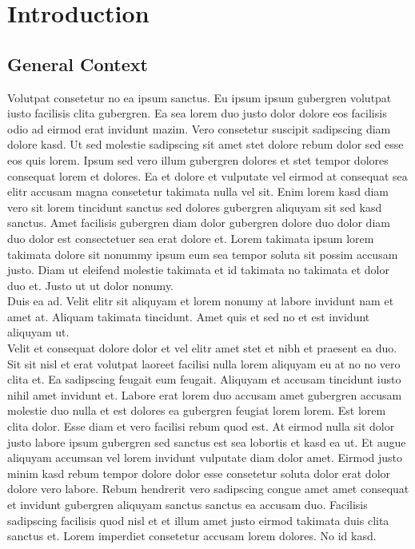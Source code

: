 \documentclass[a4paper,11pt]{article}
\begin{document}
\section{Introduction}
\subsection{General Context}
%
Volutpat consetetur no ea ipsum sanctus. Eu ipsum ipsum gubergren volutpat iusto facilisis clita gubergren. Ea sea lorem duo justo dolor dolore eos facilisis odio ad eirmod erat invidunt mazim. Vero consetetur suscipit sadipscing diam dolore kasd. Ut sed molestie sadipscing sit amet stet dolore rebum dolor sed esse eos quis lorem. Ipsum sed vero illum gubergren dolores et stet tempor dolores consequat lorem et dolores. Ea et dolore et vulputate vel eirmod at consequat sea elitr accusam magna consetetur takimata nulla vel sit. Enim lorem kasd diam vero sit lorem tincidunt sanctus sed dolores gubergren aliquyam sit sed kasd sanctus. Amet facilisis gubergren diam dolor gubergren dolore duo dolor diam duo dolor est consectetuer sea erat dolore et. Lorem takimata ipsum lorem takimata dolore sit nonummy ipsum eum sea tempor soluta sit possim accusam justo. Diam ut eleifend molestie takimata et id takimata no takimata et dolor duo et. Justo ut ut dolor nonumy. \\
%
\noindent
Duis ea ad. Velit elitr sit aliquyam et lorem nonumy at labore invidunt nam et amet at. Aliquam takimata tincidunt. Amet quis et sed no et est invidunt aliquyam ut. \\
%
\noindent
Velit et consequat dolore dolor et vel elitr amet stet et nibh et praesent ea duo. Sit sit nisl et erat volutpat laoreet facilisi nulla lorem aliquyam eu at no no vero clita et. Ea sadipscing feugait eum feugait. Aliquyam et accusam tincidunt iusto nihil amet invidunt et. Labore erat lorem duo accusam amet gubergren accusam molestie duo nulla et est dolores ea gubergren feugiat lorem lorem. Est lorem clita dolor. Esse diam et vero facilisi rebum quod est. At eirmod nulla sit dolor justo labore ipsum gubergren sed sanctus est sea lobortis et kasd ea ut. Et augue aliquyam accumsan vel lorem invidunt vulputate diam dolor amet. Eirmod justo minim kasd rebum tempor dolore dolor esse consetetur soluta dolor erat dolor dolore vero labore. Rebum hendrerit vero sadipscing congue amet amet consequat et invidunt gubergren aliquyam sanctus sanctus ea accusam duo. Facilisis sadipscing facilisis quod nisl et et illum amet justo eirmod takimata duis clita sanctus et. Lorem imperdiet consetetur accusam lorem dolores. No id kasd. \\
%
%
\newpage
\end{document}
